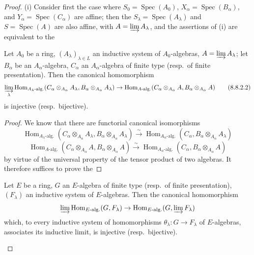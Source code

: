 \begin{proof}
(i) Consider first the case where $S_0=\operatorname{Spec}(A_0)$, $X_\alpha=\operatorname{Spec}(B_\alpha)$, and $Y_\alpha=\operatorname{Spec}(C_\alpha)$ are affine; then the $S_\lambda=\operatorname{Spec}(A_\lambda)$ and $S=\operatorname{Spec}(A)$ are also affine, with $A=\varinjlim A_\lambda$, and the assertions of (i) are equivalent to the

\begin{lemma}[8.8.2.1]
\label{IV.8.8.2.1}
Let $A_0$ be a ring, $(A_\lambda)_{\lambda\in L}$ an inductive system of $A_0$-algebras, $A=\varinjlim A_\lambda$; let $B_\alpha$ be an $A_\alpha$-algebra, $C_\alpha$ an $A_\alpha$-algebra of finite type (resp.\ of finite presentation).
Then the canonical homomorphism
\[
  \varinjlim_\lambda\operatorname{Hom}_{A_\lambda\text{-alg.}}(C_\alpha\otimes_{A_\alpha}A_\lambda,B_\alpha\otimes_{A_\alpha}A_\lambda)\to\operatorname{Hom}_{A\text{-alg.}}(C_\alpha\otimes_{A_\alpha}A,B_\alpha\otimes_{A_\alpha}A)
  \tag{8.8.2.2}\label{IV.8.8.2.2}
\]
is injective (resp.\ bijective).
\end{lemma}

\begin{proof}
We know that there are functorial canonical isomorphisms
\[
  \operatorname{Hom}_{A_\lambda\text{-alg.}}(C_\alpha\otimes_{A_\alpha}A_\lambda,B_\alpha\otimes_{A_\alpha}A_\lambda)\xrightarrow{\sim}\operatorname{Hom}_{A_\alpha\text{-alg.}}(C_\alpha,B_\alpha\otimes_{A_\alpha}A_\lambda)
\]
\[
  \operatorname{Hom}_{A\text{-alg.}}(C_\alpha\otimes_{A_\alpha}A,B_\alpha\otimes_{A_\alpha}A)\xrightarrow{\sim}\operatorname{Hom}_{A_\alpha\text{-alg.}}(C_\alpha,B_\alpha\otimes_{A_\alpha}A)
\]
by virtue of the universal property of the tensor product of two algebras.
It therefore suffices to prove the
\end{proof}

\begin{lemma}[8.8.2.3]
\label{IV.8.8.2.3}
Let $E$ be a ring, $G$ an $E$-algebra of finite type (resp.\ of finite presentation), $(F_\lambda)$ an inductive system of $E$-algebras.
Then the canonical homomorphism
\[
  \varinjlim\operatorname{Hom}_{E\text{-alg.}}(G,F_\lambda)\to\operatorname{Hom}_{E\text{-alg.}}(G,\varinjlim F_\lambda)
\]
which, to every inductive system of homomorphisms $\theta_\lambda:G\to F_\lambda$ of $E$-algebras, associates its inductive limit, is injective (resp.\ bijective).
\end{lemma}


\end{proof}
